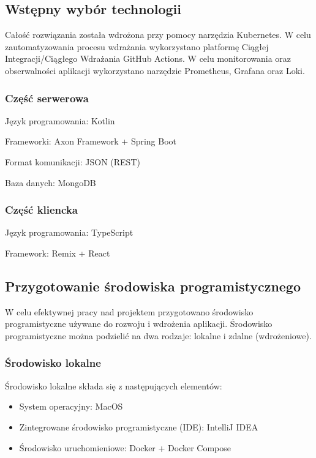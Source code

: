 \subsection{Wstępny wybór technologii}

Całość rozwiązania została wdrożona przy pomocy narzędzia Kubernetes. W celu zautomatyzowania procesu wdrażania wykorzystano platformę Ciągłej Integracji/Ciągłego Wdrażania GitHub Actions. W celu monitorowania oraz obserwalności aplikacji wykorzystano narzędzie Prometheus, Grafana oraz Loki.

\subsubsection{Część serwerowa}

Język programowania: Kotlin

Frameworki: Axon Framework + Spring Boot

Format komunikacji: JSON (REST)

Baza danych: MongoDB

\subsubsection{Część kliencka}

Język programowania: TypeScript

Framework: Remix + React

\subsection{Przygotowanie środowiska programistycznego}

W celu efektywnej pracy nad projektem przygotowano środowisko programistyczne używane do rozwoju i wdrożenia aplikacji. Środowisko programistyczne można podzielić na dwa rodzaje: lokalne i zdalne (wdrożeniowe).

\subsubsection{Środowisko lokalne}

Środowisko lokalne składa się z następujących elementów:

\begin{itemize}
    \item System operacyjny: MacOS
    \item Zintegrowane środowisko programistyczne (IDE): IntelliJ IDEA
    \item Środowisko uruchomieniowe: Docker + Docker Compose
\end{itemize}


